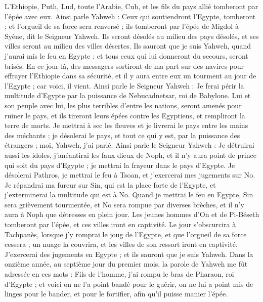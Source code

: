 \begin{multicols}{2}
L'Ethiopie, Puth, Lud, toute l'Arabie, Cub, et les fils du pays allié tomberont par l'épée avec eux.
Ainsi parle Yahweh : Ceux qui soutiendront l'Egypte, tomberont ; et l'orgueil de sa force sera renversé ; ils tomberont par l'épée de Migdol à Syène, dit le Seigneur Yahweh.
Ils seront désolés au milieu des pays désolés, et ses villes seront au milieu des villes désertes.
Ils sauront que je suis Yahweh, quand j'aurai mis le feu en Egypte ; et tous ceux qui lui donneront du secours, seront brisés.
En ce jour-là, des messagers sortiront de ma part sur des navires pour effrayer l'Ethiopie dans sa sécurité, et il y aura entre eux un tourment au jour de l'Egypte ; car voici, il vient.
Ainsi parle le Seigneur Yahweh : Je ferai périr la multitude d'Egypte par la puissance de Nebucadnetsar, roi de Babylone.
Lui et son peuple avec lui, les plus terribles d'entre les nations, seront amenés pour ruiner le pays, et ils tireront leurs épées contre les Egyptiens, et rempliront la terre de morts.
Je mettrai à sec les fleuves et je livrerai le pays entre les mains des méchants ; je désolerai le pays, et tout ce qui y est, par la puissance des étrangers ; moi, Yahweh, j'ai parlé.
Ainsi parle le Seigneur Yahweh : Je détruirai aussi les idoles, j'anéantirai les faux dieux de Noph, et il n'y aura point de prince qui soit du pays d'Egypte ; je mettrai la frayeur dans le pays d'Egypte.
Je désolerai Pathros, je mettrai le feu à Tsoan, et j'exercerai mes jugements sur No.
Je répandrai ma fureur sur Sin, qui est la place forte de l'Egypte, et j'exterminerai la multitude qui est à No.
Quand je mettrai le feu en Egypte, Sin sera grièvement tourmentée, et No sera rompue par diverses brèches, et il n'y aura à Noph que détresses en plein jour.
Les jeunes hommes d'On et de Pi-Béseth tomberont par l'épée, et ces villes iront en captivité.
Le jour s'obscurcira à Tachpanès, lorsque j'y romprai le joug de l'Egypte, et que l'orgueil de sa force cessera ; un nuage la couvrira, et les villes de son ressort iront en captivité.
J'exercerai des jugements en Egypte ; et ils sauront que je suis Yahweh.
Dans la onzième année, au septième jour du premier mois, la parole de Yahweh me fût adressée en ces mots :
Fils de l'homme, j'ai rompu le bras de Pharaon, roi d'Egypte ; et voici on ne l'a point bandé pour le guérir, on ne lui a point mis de linges pour le bander, et pour le fortifier, afin qu'il puisse manier l'épée.

\end{multicols}
